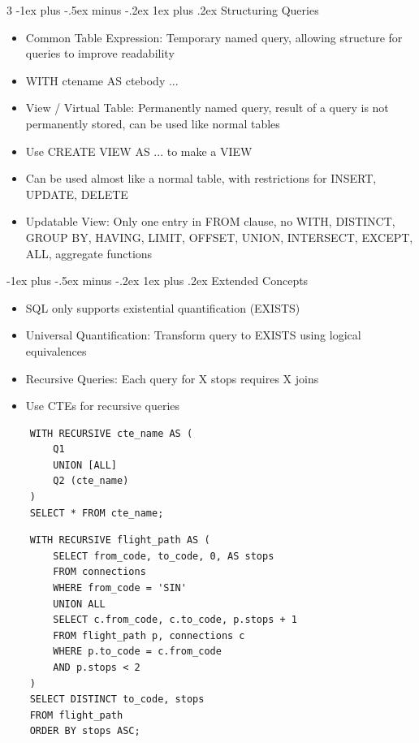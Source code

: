 \documentclass[10pt, landscape]{article}
\makeatletter
\renewcommand{\subsection}{\@startsection{subsection}{3}{0mm}%
                                {-1ex plus -.5ex minus -.2ex}%
                                {1ex plus .2ex}%
                                {\normalfont\small\bfseries}}%
\makeatother
\begin{document}
\begin{multicols*}{3}
\subsection{Structuring Queries}
\begin{itemize}
    \item Common Table Expression: Temporary named query, allowing structure for queries to improve readability
    \item WITH ctename AS ctebody ...
    \item View / Virtual Table: Permanently named query, result of a query is not permanently stored, can be used like normal tables
    \item Use CREATE VIEW AS ... to make a VIEW
    \item Can be used almost like a normal table, with restrictions for INSERT, UPDATE, DELETE
    \item Updatable View: Only one entry in FROM clause, no WITH, DISTINCT, GROUP BY, HAVING, LIMIT, OFFSET, UNION, INTERSECT, EXCEPT, ALL, aggregate functions
\end{itemize}

\subsection{Extended Concepts}
\begin{itemize}
    \item SQL only supports existential quantification (EXISTS)
    \item Universal Quantification: Transform query to EXISTS using logical equivalences
    \item Recursive Queries: Each query for X stops requires X joins
    \item Use CTEs for recursive queries
\end{itemize}
\begin{verbatim}
    WITH RECURSIVE cte_name AS (
        Q1
        UNION [ALL]
        Q2 (cte_name)
    )
    SELECT * FROM cte_name;
\end{verbatim}
\begin{verbatim}
    WITH RECURSIVE flight_path AS (
        SELECT from_code, to_code, 0, AS stops
        FROM connections
        WHERE from_code = 'SIN'
        UNION ALL
        SELECT c.from_code, c.to_code, p.stops + 1
        FROM flight_path p, connections c
        WHERE p.to_code = c.from_code
        AND p.stops < 2
    )
    SELECT DISTINCT to_code, stops
    FROM flight_path
    ORDER BY stops ASC;
\end{verbatim}

\end{multicols*}
\end{document}
